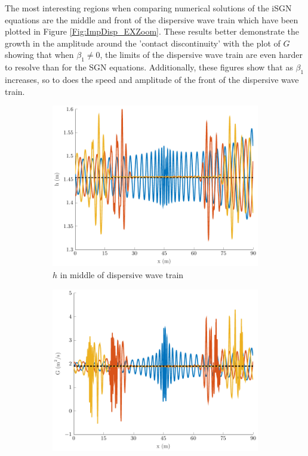 \documentclass[10pt]{elsarticle}
\begin{document}
The most interesting regions when comparing numerical solutions of the iSGN equations are the middle and front of the dispersive wave train which have been plotted in Figure \ref{Fig:ImpDisp_EXZoom}. These results better demonstrate the growth in the amplitude around the 'contact discontinuity' \cite{Pitt-2018-61} with the plot of $G$ showing that when $\beta_1 \neq 0$, the limits of the dispersive wave train are even harder to resolve than for the SGN equations. Additionally, these figures show that as $\beta_1$ increases, so to does the speed and amplitude of the front of the dispersive wave train.
%
\begin{figure}
	\centering
	\begin{subfigure}{0.32\textwidth}
		\centering
		\includegraphics[width=\textwidth]{./Figures/Simulations/Study/ImpDisp/hMiddle.pdf}
		\caption{$h$ in middle of dispersive wave train}
	\end{subfigure}
	\begin{subfigure}{0.32\textwidth}
		\centering
		\includegraphics[width=\textwidth]{./Figures/Simulations/Study/ImpDisp/GMiddle.pdf}

\end{subfigure}
\end{figure}
\end{document}
